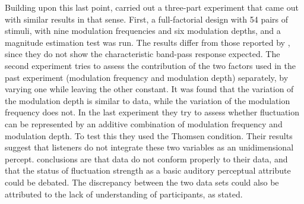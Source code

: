 \documentclass[../main.tex]{subfiles}
\begin{document}
\begin{theoreticalbackground}
Building upon this last point, \citeauthor{Wickelmaier2004Scaling} carried out
a three-part experiment that came out with similar results in that sense. First,
a full-factorial design with 54 pairs of stimuli, with nine modulation
frequencies and six modulation depths, and a magnitude estimation test was run.
The results differ from those reported by \citeauthor{Fastl2007Psychoacoustics},
since they do not show the characteristic band-pass response expected. The
second experiment tries to assess the contribution of the two factors used in
the past experiment (modulation frequency and modulation depth) separately, by
varying one while leaving the other constant. It was found that the variation of
the modulation depth is similar to \citeauthor{Fastl2007Psychoacoustics} data,
while the variation of the modulation frequency does not. In the last experiment
they try to assess whether fluctuation can be represented by an additive
combination of modulation frequency and modulation depth. To test this they used
the Thomsen condition. Their results suggest that listeners do not integrate
these two variables as an unidimensional percept.
\citeauthor{Wickelmaier2004Scaling} conclusions are that
\citeauthor{Fastl2007Psychoacoustics} data do not conform properly to their
data, and that the status of fluctuation strength as a basic auditory perceptual
attribute could be debated. The discrepancy between the two data sets could also
be attributed to the lack of understanding of participants, as
\citeauthor{Accolti2009Fluctuation} stated.

\end{theoreticalbackground}
\end{document}
